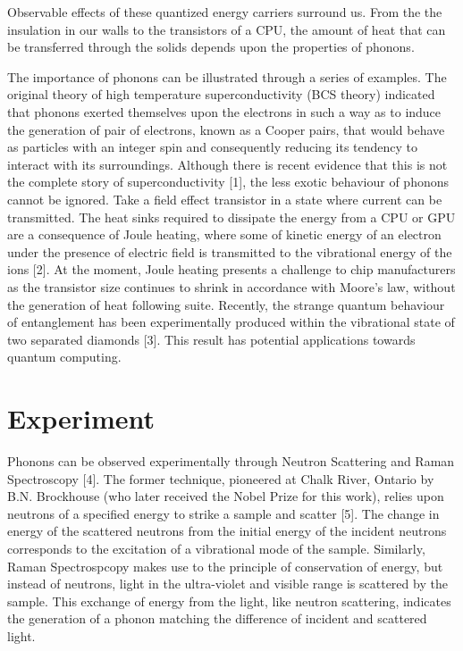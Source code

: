 \documentclass{article}
\numberwithin{equation}{section}
\begin{document}
Observable effects of these quantized energy carriers surround us. From the the insulation in our walls to the transistors of a CPU, the amount of heat that can be transferred through the solids depends upon the properties of phonons.

The importance of phonons can be illustrated through a series of examples. The original theory of high temperature superconductivity (BCS theory) indicated that phonons exerted themselves upon the electrons in such a way as to induce the generation of pair of electrons, known as a Cooper pairs, that would behave as particles with an integer spin and consequently reducing its tendency to interact with its surroundings. Although there is recent evidence that this is not the complete story of superconductivity [1], the less exotic behaviour of phonons cannot be ignored. Take a field effect transistor in a state where current can be transmitted. The heat sinks required to dissipate the energy from a CPU or GPU are a consequence of Joule heating, where some of kinetic energy of an electron under the presence of electric field is transmitted to the vibrational energy of the ions [2]. At the moment, Joule heating presents a challenge to chip manufacturers as the transistor size continues to shrink in accordance with Moore's law, without the generation of heat following suite. Recently, the strange quantum behaviour of entanglement has been experimentally produced within the vibrational state of two separated diamonds [3]. This result has potential applications towards quantum computing.

\section{Experiment}

Phonons can be observed experimentally through Neutron Scattering and Raman Spectroscopy [4]. The former technique, pioneered at Chalk River, Ontario by B.N. Brockhouse (who later received the Nobel Prize for this work), relies upon neutrons of a specified energy to strike a sample and scatter [5]. The change in energy of the scattered neutrons from the initial energy of the incident neutrons corresponds to the excitation of a vibrational mode of the sample. Similarly, Raman Spectrospcopy makes use to the principle of conservation of energy, but instead of neutrons, light in the ultra-violet and visible range is scattered by the sample. This exchange of energy from the light, like neutron scattering, indicates the generation of a phonon matching the difference of incident and scattered light.
\end{document}
